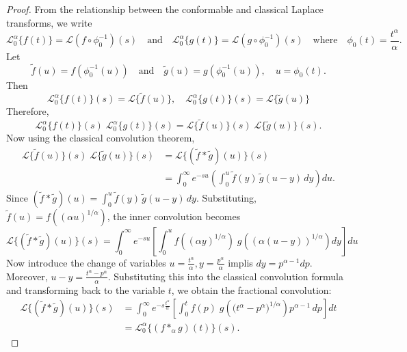\documentclass[two side,reqno,12pt]{amsart}
\numberwithin{equation}{section}
\theoremstyle{definition}
\begin{document}
\begin{proof}
From the relationship between the conformable and classical Laplace transforms, we write  
\[ \mathcal{L}_0^{\alpha} \{ f(t) \} = \mathcal{L}(f \circ \phi_0^{-1})(s) \quad\text{and}\quad\mathcal{L}_0^{\alpha} \{ g(t) \} = \mathcal{L}(g \circ \phi_0^{-1})(s) \quad\text{where}\quad \phi_0(t) = \frac{t^\alpha}{\alpha}.
\]
Let
\[
\tilde{f}(u) = f(\phi_0^{-1}(u)) \quad\text{and} \quad \tilde{g}(u) = g(\phi_0^{-1}(u)),\quad  u = \phi_0(t).
\]
Then
\[
\mathcal{L}_0^{\alpha} \{ f(t) \}(s) = \mathcal{L} \{ \tilde{f}(u) \}, \quad \mathcal{L}_0^{\alpha} \{ g(t) \}(s) = \mathcal{L} \{ \tilde{g}(u) \}
\]
Therefore, 
\[
\mathcal{L}_0^{\alpha}\{f(t)\}(s) \; \mathcal{L}_0^{\alpha}\{g(t)\}(s) = \mathcal{L}\{\tilde{f}(u)\} (s)\; \mathcal{L}\{\tilde{g}(u)\}(s).
\]
Now using the classical convolution theorem,
\begin{align*}
   \mathcal{L}\{\tilde{f}(u)\}(s) \; \mathcal{L}\{\tilde{g}(u)\}(s)
   &= \mathcal{L}\{(\tilde{f} * \tilde{g})(u)\}(s) \\
   &= \int_{0}^{\infty} e^{-su} \left(\int_0^u \tilde{f}(y) \, \tilde{g}(u - y) \, dy \right) du.
\end{align*}
Since
\(
(\tilde{f} * \tilde{g})(u) = \int_0^u \tilde{f}(y) \, \tilde{g}(u - y) \, dy .
\)
Substituting,
\(
\tilde{f}(u) = f\!\left((\alpha u)^{1/\alpha}\right)
\), the inner convolution becomes
\[
\mathcal{L}\{(\tilde{f} * \tilde{g})(u)\}(s) = \int_{0}^{\infty} e^{-su}\left[ \int_0^u f\!\left((\alpha y)^{1/\alpha}\right)\;g\!\left((\alpha(u- y))^{1/\alpha}\right)dy \right] du 
\]
Now introduce the change of variables
\(
u = \frac{ t^{\alpha}}{\alpha}, y = \frac{ p^{\alpha}}{\alpha}\)  implis \( dy = p^{\alpha-1} dp. 
\)
Moreover,
\(
u - y = \frac{t^{\alpha} - p^{\alpha}}{\alpha}.
\)
Substituting this into the classical convolution formula and transforming back to the variable \(t\), we obtain the fractional convolution:
\begin{align*}
\mathcal{L}\{(\tilde{f} * \tilde{g})(u)\}(s)
& =\int_{0}^{\infty} e^{-s\frac{ t^{\alpha}}{\alpha}}
\left[ \int_{0}^{t} f(p) \; g\!\left( \big( t^{\alpha} - p^{\alpha}\big)^{1/\alpha} \right)
p^{\alpha-1} \, dp \right] dt \\
&=\mathcal{L}_0^{\alpha}\{(f *_{\alpha} g)(t)\}(s).
\end{align*}
\end{proof}
\end{document}
